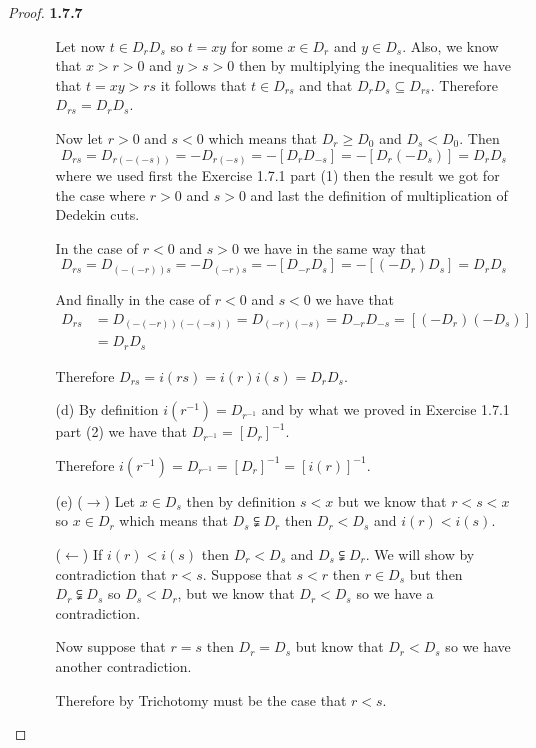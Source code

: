 \documentclass[11pt]{article}
\theoremstyle{definition}
\begin{document}
\begin{proof}{\textbf{1.7.7}}
\begin{itemize}
\begin{itemize}
                Let now $t \in D_rD_s$ so $t = xy$ for some $x \in D_r$ and $y \in D_s$.
                Also, we know that $x >r>0$ and $y>s>0$ then by multiplying the
                inequalities we have that $t = xy>rs$ it follows that $t \in D_{rs}$ and 
                that $D_rD_s \subseteq D_{rs}$. Therefore $D_{rs} = D_rD_s$.

                Now let $r>0$ and $s<0$ which means that $D_r \geq D_0$ and $D_s < D_0$.
                Then 
                $$D_{rs} = D_{r(-(-s))} = -D_{r(-s)} = -[D_rD_{-s}] = -[D_r(-D_s)] = D_rD_s$$
                where we used first the Exercise 1.7.1 part (1) then the result we got
                for the case where $r>0$ and $s>0$ and last the definition of
                multiplication of Dedekin cuts.
                
                In the case of $r<0$ and $s>0$ we have in the same way that 
                $$D_{rs} = D_{(-(-r))s} = -D_{(-r)s} = -[D_{-r}D_s] = -[(-D_r)D_s] = D_rD_s$$
                
                And finally in the case of $r<0$ and $s<0$ we have that 
                \begin{align*}
                    D_{rs} &= D_{(-(-r))(-(-s))} = D_{(-r)(-s)} = D_{-r}D_{-s} = [(-D_r)(-D_s)] \\
                           &= D_rD_s
                \end{align*}

                Therefore $D_{rs} = i(rs) = i(r)i(s) = D_rD_s$.

                \item [(d)] By definition $i(r^{-1}) = D_{r^{-1}}$ and by what we proved
                in Exercise 1.7.1 part (2) we have that $D_{r^{-1}} = [D_{r}]^{-1}$.

                Therefore $i(r^{-1}) = D_{r^{-1}} = [D_{r}]^{-1} = [i(r)]^{-1}$.

                \item [(e)] ($\rightarrow$) Let $x \in D_s$ then by definition $s<x$
                but we know that $r<s<x$ so $x \in D_r$ which
                means that $D_s \subsetneqq D_r$ then $D_r < D_s$ and $i(r)<i(s)$.

                ($\leftarrow$) If $i(r)<i(s)$ then $D_r < D_s$ and $D_s \subsetneqq D_r$.
                We will show by contradiction that $r<s$.
                Suppose that $s<r$ then $r \in D_s$ but then $D_r \subsetneqq D_s$ so 
                $D_s < D_r$, but we know that $D_r < D_s$ so we have a contradiction.
                
                Now suppose that $r=s$ then $D_r = D_s$ but know that $D_r < D_s$ so
                we have another contradiction.

                Therefore by Trichotomy must be the case that $r<s$.
            \end{itemize}
        \end{itemize}
    \end{proof}
    
\end{document}
